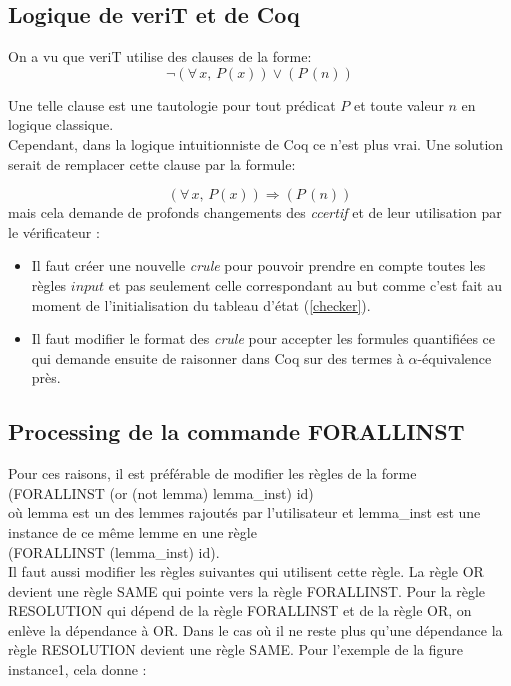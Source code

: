 \documentclass[11pt]{article}
\begin{document}
\subsection{Logique de veriT et de Coq}
On a vu que veriT utilise des clauses de la forme: 
\[  \neg (\forall \, x, \, P(x)) \vee (P \, (n)) \]

Une telle clause est une tautologie pour tout prédicat $P$ et toute valeur $n$ en logique classique. \\

Cependant, dans la logique intuitionniste de Coq ce n'est plus vrai. Une solution serait de remplacer cette clause par la formule:

\[   (\forall \, x, \, P(x)) \Rightarrow (P \, (n)) \]
mais cela demande de profonds changements des \textit{ccertif} et de leur utilisation par le vérificateur : 
\begin{itemize}

\item Il faut créer une nouvelle \textit{crule} pour pouvoir prendre en compte toutes les règles $input$ et pas seulement celle correspondant au but comme c'est fait au moment de l'initialisation du tableau d'état (\ref{checker}).
\item Il faut modifier le format des \textit{crule} pour accepter les formules quantifiées ce qui demande ensuite de raisonner dans Coq sur des termes à $\alpha$-équivalence près.
\end{itemize}


\subsection{Processing de la commande FORALLINST} \label{processing_forallinst}

Pour ces raisons, il est préférable de modifier les règles de la forme \\
     (FORALLINST (or (not lemma) lemma\_inst) id)\\
où lemma est un des lemmes rajoutés par l'utilisateur et lemma\_inst est une instance de ce même lemme en une règle \\

(FORALLINST (lemma\_inst) id).\\

Il faut aussi modifier les règles suivantes qui utilisent cette règle. La règle OR devient une règle SAME qui pointe vers la règle FORALLINST. Pour la règle RESOLUTION qui dépend de la règle FORALLINST et de la règle OR, on enlève la dépendance à OR. Dans le cas où il ne reste plus qu'une dépendance la règle RESOLUTION devient une règle SAME. Pour l'exemple de la figure instance1, cela donne : \\
\end{document}
